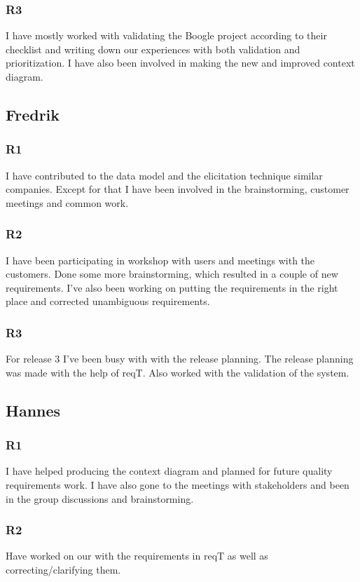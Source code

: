 \documentclass[a4paper]{article}
\begin{document}
		\subsubsection{R3}
		I have mostly worked with validating the Boogle project according to their checklist and writing down our experiences with both validation and prioritization. I have also been involved in making the new and improved context diagram.
			
	\subsection{Fredrik}
		\subsubsection{R1}
		I have contributed to the data model and the elicitation technique similar companies. Except for that I have been involved in the brainstorming, customer meetings and common work.
		\subsubsection{R2}
		I have been participating in workshop with users and meetings with the customers. Done some more brainstorming, which resulted in a couple of new requirements. I've also been working on putting the requirements in the right place and corrected unambiguous requirements.
		\subsubsection{R3}
		For release 3 I've been busy with with the release planning. The release planning was made with the help of reqT. Also worked with the validation of the system.
		
	\subsection{Hannes}
		\subsubsection{R1}
		I have helped producing the context diagram and planned for future quality requirements work. I have also gone to the meetings with stakeholders and been in the group discussions and brainstorming.
		\subsubsection{R2}
		Have worked on our with the requirements in reqT as well as correcting/clarifying them.  
\end{document}
